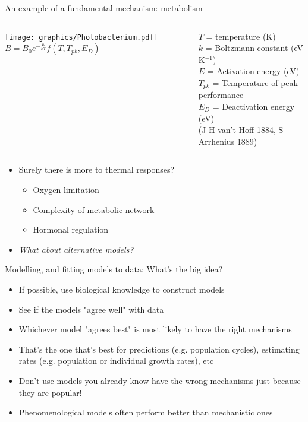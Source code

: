 \documentclass[xcolor=x11names,compress]{beamer}
\renewcommand{\(}{\begin{columns}}
\renewcommand{\)}{\end{columns}}
\newcommand{\<}[1]{\begin{column}{#1}}
\renewcommand{\>}{\end{column}}
\begin{document}
\begin{frame}{An example of a fundamental mechanism: metabolism}
      
\begin{columns}[c]
  \column{2.1in}
    \pause
      \texttt{[image: graphics/Photobacterium.pdf]}
  \pause
  \column{2.7in}
    $B = B_0 \boxed {e^{-\frac{E}{kT}}}f(T,T_{pk},E_D)$\\
    \vspace{10pt}
    \raggedright{$T$ = temperature (K)\\
     $k$ = Boltzmann constant (eV K$^{-1}$)}\\
     $E$ = Activation energy (eV)\\
     $T_{pk}$ = Temperature of peak performance\\
     $E_D$ = Deactivation energy (eV)\\
    {\small (J H van't Hoff 1884, S Arrhenius 1889)}
\end{columns}

\begin{itemize}\setlength{\itemindent}{0em}
  \pause
  \item Surely there is more to thermal responses?
    \begin{itemize}\setlength{\itemindent}{-1em}
     \item Oxygen limitation
     \item Complexity of metabolic network
     \item Hormonal regulation
    \end{itemize}
    \pause
  \item \textit{What about alternative models?}\\

\end{itemize}
 
\end{frame}

\begin{frame}{Modelling, and fitting models to data: What's the big idea?}

\begin{itemize} \itemsep8pt

	\item If possible, use biological knowledge to construct models
	\item See if the models "agree well" with data
	\item Whichever model "agrees best" is most likely to have the right 
	mechanisms
	\item That's the one that's best for predictions (e.g. population 
	cycles), estimating rates (e.g. population or individual growth rates), etc
	\item Don't use models you already know have the wrong mechanisms just because they are popular!
	\item Phenomenological models often perform better than mechanistic ones

\end{itemize}
  
\end{frame}
\end{document}
